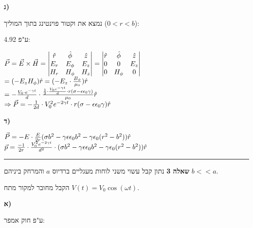 \documentclass[14pt]{extarticle}
\makeatletter
\newenvironment{lefteqs}{%
    \begin{english}%
    \begin{flushleft}%
    \renewcommand{\arraystretch}{1.3}%
    $\begin{array}{@{}l@{}}%
}{%
    \end{array}$%
    \end{flushleft}%
    \end{english}%
}
\makeatother
\begin{document}
\textbf{ג)} 

נמצא את וקטור פוינטינג בתוך המוליך ($0<r<b$):

ע"פ 4.92:

\begin{lefteqs}
    \vec{P}=\vec{E}\times\vec{H} =
    \begin{vmatrix}
        \hat{r} & \hat{\phi} & \hat{z}\\
        E_r & E_\phi & E_z\\
        H_r & H_\phi & H_z
    \end{vmatrix}
    = \begin{vmatrix}
        \hat{r} & \hat{\phi} & \hat{z}\\
        0 & 0 & E_z\\
        0 & H_\phi & 0
    \end{vmatrix} \\
    = (-E_z H_\phi)\hat{r} = (-E_z \cdot \frac{B_\phi}{\mu_0})\hat{r} \\
    = -\frac{V_0 \cdot e^{-\gamma t}}{d} \cdot \frac{\frac{1}{2} \cdot \frac{V_0 e^{-\gamma t}}{d}\cdot r(\sigma - \epsilon \epsilon_0 \gamma)}{\mu_0} \hat{r} \\
    \Rightarrow \vec{P} = -\frac{1}{2d} \cdot V_0^2 e^{-2\gamma t} \cdot r(\sigma -\epsilon \epsilon_0 \gamma) \hat{r}
\end{lefteqs}

\textbf{ד)} 
\begin{lefteqs}
   \vec{P} = -E \cdot \frac{E}{2r} (\sigma b^2 - \gamma \epsilon \epsilon_0 b^2 -\gamma \epsilon_0 (r^2 - b^2)) \hat{r} \\
   \vec{p} = \frac{-1}{2r} \cdot \frac{V_0^2 e^{-2\gamma t}}{d^2} \cdot (\sigma b^2 - \gamma \epsilon \epsilon_0 b^2 -\gamma \epsilon_0(r^2-b^2)) \hat{r}
\end{lefteqs}

\vspace{3em}
\hrule
\vspace{2em}

\textbf{\large שאלה 3}
נתון קבל עשוי משני לוחות מעגליים ברדיוס $a$ והמרחק ביניהם $b<<a$.

הקבל מחובר למקור מתח $V(t)=V_0\cos(\omega t)$.

\textbf{א)} 

ע"פ חוק אמפר:
\end{document}
